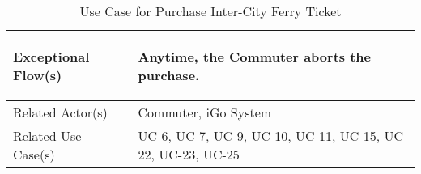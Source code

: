 \begin{table}[ht]
\begin{tabular}{|l|p{11cm}|}
         \hline
         Exceptional Flow(s)& 
         \begin{enumerate*}[itemjoin=\newline]
             \item Anytime, the Commuter aborts the purchase.
         \end{enumerate*} \\
         \hline
         Related Actor(s)   & Commuter, iGo System \\
         \hline
         Related Use Case(s)& UC-6, UC-7, UC-9, UC-10, UC-11, UC-15, UC-22, UC-23, UC-25\\
         \hline
    \end{tabular}
    \caption{Use Case for Purchase Inter-City Ferry Ticket}
    \label{tab:UC_PurchaseInterCityFerryTicket}
\end{table}

